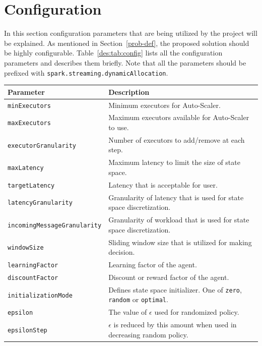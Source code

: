 \section{Configuration}
\label{des:conf}
In this section configuration parameters that are being utilized by the project will be explained. As mentioned in Section~\ref{prob-def}, the proposed solution should be highly configurable. Table~\ref{des:tab:config} lists all the configuration parameters and describes them briefly. Note that all the parameters should be prefixed with \lstinline|spark.streaming.dynamicAllocation|.
\begin{table}[h]
    \begin{tabularx}{\textwidth}{lX}
        \toprule
        \textbf{Parameter} & \textbf{Description}\\
        \midrule
        \lstinline|minExecutors| & Minimum executors for Auto-Scaler.\\
        \lstinline|maxExecutors| & Maximum executors available for Auto-Scaler to use. \\
        \lstinline|executorGranularity| & Number of executors to add/remove at each step. \\
        \lstinline|maxLatency| & Maximum latency to limit the size of state space. \\
        \lstinline|targetLatency| & Latency that is acceptable for user. \\
        \lstinline|latencyGranularity| & Granularity of latency that is used for state space discretization. \\
        \lstinline|incomingMessageGranularity| & Granularity of workload that is used for state space discretization. \\
        \lstinline|windowSize| & Sliding window size that is utilized for making decision. \\
        \lstinline|learningFactor| & Learning factor of the agent. \\
        \lstinline|discountFactor| & Discount or reward factor of the agent. \\
        \lstinline|initializationMode| & Defines state space initializer. One of \lstinline|zero|, \lstinline|random| or \lstinline|optimal|. \\
        \lstinline|epsilon| & The value of $\epsilon$ used for randomized policy. \\
        \lstinline|epsilonStep| & $\epsilon$ is reduced by this amount when used in decreasing random policy. \\

\end{tabularx}
\end{table}
